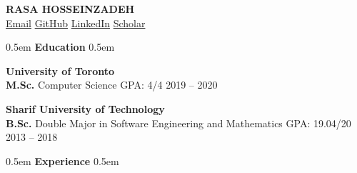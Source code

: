 \documentclass[11pt,a4paper]{article}
\newcommand{\cvsection}[1]{%
    \vspace{10pt}
    \noindent\hfill\kern0.5em
    {\Huge \textbf{\textcolor{maincolor}{#1}}}%
    \kern0.5em\hfill\vspace{8pt}
}
\begin{document}
\RaggedRight %

\begin{center}
    {\Huge \textbf{\MakeUppercase{Rasa Hosseinzadeh}}} \\[5pt]
    \href{mailto:rasa.hosseinzadeh@gmail.com}{\textcolor{maincolor}{\faEnvelope}\hspace{0.5em} Email} \hspace{1.5em}
    \href{https://github.com/rasaHosseinzadeh}{\textcolor{maincolor}{\faGithub}\hspace{0.5em} GitHub} \hspace{1.5em}
    \href{https://linkedin.com/in/rasa-hosseinzadeh-6204a6208}{\textcolor{maincolor}{\faLinkedin}\hspace{0.5em} LinkedIn} \hspace{1.5em}
    \href{https://scholar.google.com/citations?user=1Evd7mYAAAAJ}{\textcolor{maincolor}{\faGraduationCap}\hspace{0.5em} Scholar}
\end{center}
\vspace{15pt}

\cvsection{Education}

{\Large \textbf{\textcolor{maincolor}{University of Toronto}}} \\
\textbf{M.Sc.} \hspace{1.4em} Computer Science \hspace{18.0em} GPA: 4/4 \hfill 2019 -- 2020 \\
\vspace{8pt}

{\Large \textbf{\textcolor{maincolor}{Sharif University of Technology}}} \\
\textbf{B.Sc.} \hspace{1.7em} Double Major in Software Engineering and Mathematics \hfill GPA: 19.04/20 \hfill 2013 -- 2018 \\
\vspace{15pt}

\cvsection{Experience}
\end{document}
